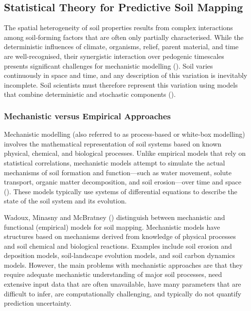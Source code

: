 \documentclass[
  10pt,
  b5paper,
  oneside]{book}
\begin{document}
\subsection{Statistical Theory for Predictive Soil Mapping}\label{statistical-theory-for-predictive-soil-mapping}

The spatial heterogeneity of soil properties results from complex interactions among soil-forming factors that are often only partially characterised. While the deterministic influences of climate, organisms, relief, parent material, and time are well-recognised, their synergistic interaction over pedogenic timescales presents significant challenges for mechanistic modelling (). Soil varies continuously in space and time, and any description of this variation is inevitably incomplete. Soil scientists must therefore represent this variation using models that combine deterministic and stochastic components ().

\subsubsection{Mechanistic versus Empirical Approaches}\label{mechanistic-versus-empirical-approaches}

Mechanistic modelling (also referred to as process-based or white-box modelling) involves the mathematical representation of soil systems based on known physical, chemical, and biological processes. Unlike empirical models that rely on statistical correlations, mechanistic models attempt to simulate the actual mechanisms of soil formation and function---such as water movement, solute transport, organic matter decomposition, and soil erosion---over time and space (). These models typically use systems of differential equations to describe the state of the soil system and its evolution.

Wadoux, Minasny and McBratney () distinguish between mechanistic and functional (empirical) models for soil mapping. Mechanistic models have structures based on mechanisms derived from knowledge of physical processes and soil chemical and biological reactions. Examples include soil erosion and deposition models, soil-landscape evolution models, and soil carbon dynamics models. However, the main problems with mechanistic approaches are that they require adequate mechanistic understanding of major soil processes, need extensive input data that are often unavailable, have many parameters that are difficult to infer, are computationally challenging, and typically do not quantify prediction uncertainty.
\end{document}
